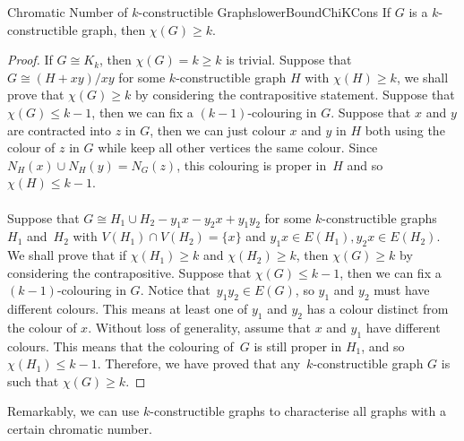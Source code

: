 \documentclass[math]{amznotes}
\theoremstyle{remark}
\begin{document}
\begin{probox}{Chromatic Number of $k$-constructible Graphs}{lowerBoundChiKCons}
    If $G$ is a $k$-constructible graph, then $\chi(G) \geq k$.
    \tcblower
    \begin{proof}
        If $G \cong K_k$, then $\chi(G) = k \geq k$ is trivial. Suppose that $G \cong (H + xy)/xy$ for some $k$-constructible graph $H$ with $\chi(H) \geq k$, we shall prove that $\chi(G) \geq k$ by considering the contrapositive statement. Suppose that $\chi(G) \leq k - 1$, then we can fix a $(k - 1)$-colouring in $G$. Suppose that $x$ and $y$ are contracted into $z$ in $G$, then we can just colour $x$ and $y$ in $H$ both using the colour of $z$ in $G$ while keep all other vertices the same colour. Since $N_H(x) \cup N_H(y) = N_G(z)$, this colouring is proper in~$H$ and so $\chi(H) \leq k - 1$. 
        \\\\
        Suppose that $G \cong H_1 \cup H_2 - y_1x - y_2x + y_1y_2$ for some $k$-constructible graphs~$H_1$ and~$H_2$ with $V(H_1) \cap V(H_2) = \{x\}$ and $y_1x \in E(H_1), y_2x \in E(H_2)$. We shall prove that if $\chi(H_1) \geq k$ and $\chi(H_2) \geq k$, then $\chi(G) \geq k$ by considering the contrapositive. Suppose that $\chi(G) \leq k - 1$, then we can fix a $(k - 1)$-colouring in $G$. Notice that~$y_1y_2 \in E(G)$, so $y_1$ and $y_2$ must have different colours. This means at least one of $y_1$ and $y_2$ has a colour distinct from the colour of $x$. Without loss of generality, assume that $x$ and $y_1$ have different colours. This means that the colouring of~$G$ is still proper in $H_1$, and so $\chi(H_1) \leq k - 1$. Therefore, we have proved that any~$k$-constructible graph $G$ is such that $\chi(G) \geq k$.
    \end{proof}
\end{probox}
Remarkably, we can use $k$-constructible graphs to characterise all graphs with a certain chromatic number.
\end{document}
